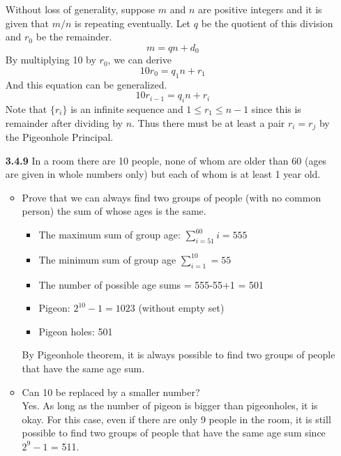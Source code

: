 \documentclass[12pt]{article}
\begin{document}
\begin{enumerate}
    Without loss of generality, suppose $m$ and $n$ are positive integers and it is given that $m/n$ is repeating eventually. Let $q$ be the quotient of this division and $r_0$ be the remainder. $$m=qn+d_0$$
    By multiplying 10 by $r_0$, we can derive
    $$10r_0 = q_1n + r_1$$
    And this equation can be generalized.
    $$10r_{i-1}=q_in+r_i$$
    Note that $\{r_i\}$ is an infinite sequence and $1\le r_1 \le n-1$ since this is remainder after dividing by $n$. Thus there must be at least a pair $r_i=r_j$ by the Pigeonhole Principal.
    \item[\bf 3.4.9] In a room there are 10 people, none of whom are older than 60 (ages are given in whole numbers only) but each of whom is at least 1 year old. 
    
    \begin{itemize}
        \item Prove that we can always find two groups of people (with no common person) the sum of whose ages is the same.
        \begin{itemize}
            \item The maximum sum of group age: $\sum\limits_{i=51}^{60} i = 555$
            \item The minimum sum of group age  $\sum\limits_{i=1}^{10} = 55$
            \item The number of possible age sums = 555-55+1 = 501
        \end{itemize}
        
        \vspace{2\baselineskip}
        \begin{itemize}
            \item Pigeon: $2^{10} - 1 = 1023$ \hfill (without empty set)
            \item Pigeon holes: 501
        \end{itemize}
        
        By Pigeonhole theorem, it is always possible to find two groups of people that have the same age sum.\\
        
        \item Can 10 be replaced by a smaller number?\\
        
        Yes. As long as the number of pigeon is bigger than pigeonholes, it is okay. For this case, even if there are only 9 people in the room, it is still possible to find two groups of people that have the same age sum since $2^9-1$ = 511.\\
        

\end{itemize}
\end{enumerate}
\end{document}
